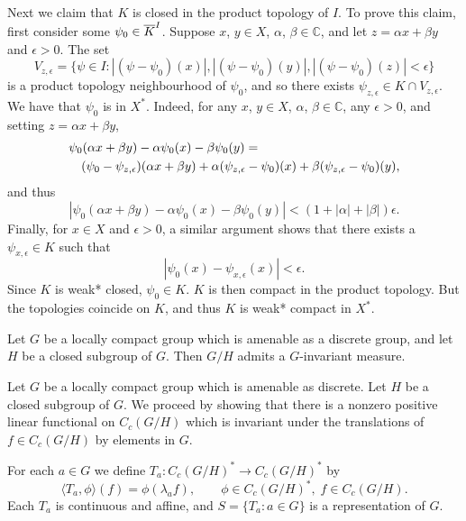 Next we claim that $K$ is closed in the product topology of $I$.  To prove this
claim, first consider some $\psi_0 \in \overline{K}^I$.  Suppose $x$, $y\in X$, $\alpha$, $\beta\in\mathbb{C}$,
and let $z=\alpha x+ \beta y$ and $\epsilon > 0$.  The set
\[
V_{z,\epsilon} = \{\psi\in I : | (\psi-\psi_0)(x)|,|(\psi-\psi_0)(y)|,|(\psi-\psi_0)(z)| < \epsilon\}
\]
is a product topology neighbourhood of $\psi_0$, and so there exists $\psi_{z,\epsilon}\in K\cap V_{z,\epsilon}$.
We have that $\psi_0$ is in $X^*$.  Indeed, for any $x$, $y\in X$, $\alpha$, $\beta\in\mathbb{C}$, any $\epsilon >0$,
and setting $z=\alpha x + \beta y$,
\begin{eqnarray*}
\lefteqn{
\psi_0(\alpha x + \beta y) - \alpha\psi_0 (x) - \beta\psi_0 (y) =} \\
 & & (\psi_0 - \psi_{z,\epsilon})(\alpha x + \beta y) + \alpha(\psi_{z,\epsilon} - \psi_0 )(x) + \beta(\psi_{z,\epsilon} - \psi_0 )(y),
\end{eqnarray*}
and thus
\[
| \psi_0(\alpha x + \beta y) - \alpha\psi_0 (x) - \beta\psi_0 (y)| < (1+| \alpha| + | \beta|)\epsilon.
\]
Finally, for $x\in X$ and $\epsilon >0$, a similar argument shows that there exists
a $\psi_{x,\epsilon} \in K$ such that
\[
|\psi_0(x)-\psi_{x,\epsilon}(x)| < \epsilon.
\]
Since $K$ is weak* closed, $\psi_0 \in K$.
$K$ is then compact in the product topology.  But
the topologies coincide on $K$, and thus $K$ is weak* compact in $X^*$.
\done

\begin{theorem}\label{coset}
Let $G$ be a locally compact group which is amenable as a discrete group,
and let $H$ be a closed subgroup of $G$.  Then $G/H$ admits a $G$-invariant
measure.
\end{theorem}
\proof
Let $G$ be a locally compact group which is amenable as discrete.  Let $H$ 
be a closed subgroup of $G$.
We proceed by showing that there is a nonzero positive linear functional 
on $C_c(G/H)$ which is invariant under the translations of $f \in 
C_c(G/H)$ by elements in $G$.
 
For each $a \in G$ we define $T_a: C_c(G/H)^*\to C_c(G/H)^*$ by
\[
\langle T_a,\phi\rangle(f) = \phi(\lambda_a f),\qquad \phi \in C_c(G/H)^*,\; f \in C_c(G/H).
\]
Each $T_a$ is continuous and affine, and $S = \{T_a : a\in G \}$ is a 
representation of $G$.

